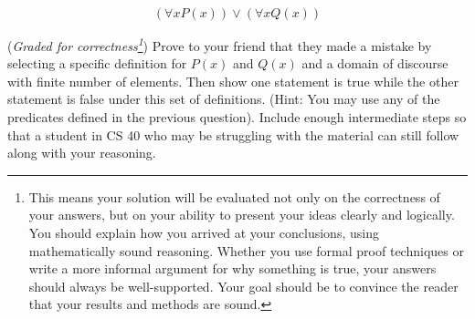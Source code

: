 \documentclass[12pt, oneside]{article}
\begin{document}
\begin{enumerate}
\[
(\forall x P(x)) \lor (\forall x Q(x)) 
\]





({\it Graded for correctness\footnote{This means your solution will be
evaluated not only on the correctness of your answers, but on your ability to 
present your ideas clearly and logically. You should explain how you arrived at your conclusions, using 
mathematically sound reasoning. Whether you use formal proof techniques or write a more informal argument for why 
something is true, your answers should always be well-supported. Your goal should be to convince the reader that 
your results and methods are sound.}}) Prove to your friend that they made a mistake by selecting a specific definition for $P(x)$ and $Q(x)$ and a domain of discourse with finite number of elements. Then show one statement is true while the other statement is false under this set of definitions. (Hint: You may use any of the predicates defined in the previous question). Include enough intermediate steps so that a student in CS 40 who may be 
struggling with the material can still follow along with your reasoning.


\end{enumerate}
\end{document}
